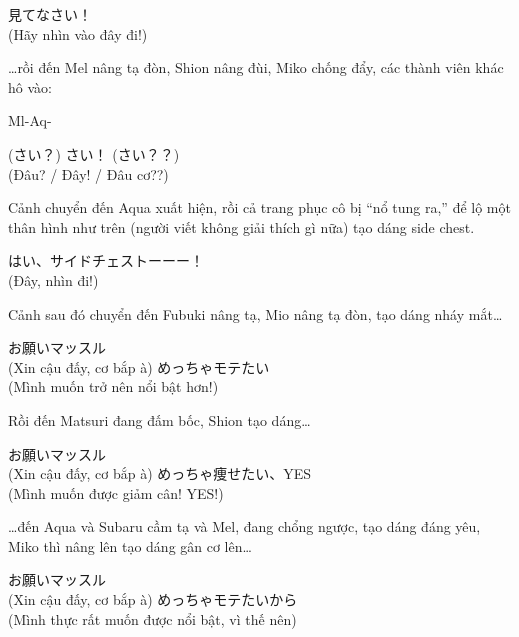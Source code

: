 \documentclass[../main.tex]{subfiles}
\begin{document}
\begin{dialogue}
   見てなさい！\\(Hãy nhìn vào đây đi!)
\end{dialogue}

\dots rồi đến Mel nâng tạ đòn, Shion nâng đùi, Miko chống đẩy, các thành viên khác hô vào:

Ml-Aq- \xdo

\begin{dialogue}
   (さい？) さい！ (さい？？)\\(Đâu? / Đây! / Đâu cơ??)
\end{dialogue}

Cảnh chuyển đến Aqua xuất hiện, rồi cả trang phục cô bị ``nổ tung ra,'' để lộ một thân hình như trên (người viết không giải thích gì nữa) tạo dáng side chest.

\begin{dialogue}
   はい、サイドチェストーーー！\\(Đây, nhìn đi!)
\end{dialogue}

Cảnh sau đó chuyển đến Fubuki nâng tạ, Mio nâng tạ đòn, tạo dáng nháy mắt\dots

\begin{dialogue}
   お願いマッスル\\(Xin cậu đấy, cơ bắp à)
   めっちゃモテたい\\(Mình muốn trở nên nổi bật hơn!)
\end{dialogue}

Rồi đến Matsuri đang đấm bốc, Shion tạo dáng\dots

\begin{dialogue}
   お願いマッスル\\(Xin cậu đấy, cơ bắp à)
   めっちゃ痩せたい、YES\\(Mình muốn được giảm cân! YES!)
\end{dialogue}

\dots đến Aqua và Subaru cầm tạ và Mel, đang chổng ngược, tạo dáng đáng yêu, Miko thì nâng lên tạo dáng gân cơ lên\dots

\begin{dialogue}
   お願いマッスル\\(Xin cậu đấy, cơ bắp à)
   めっちゃモテたいから\\(Mình thực rất muốn được nổi bật, vì thế nên)
\end{dialogue}
\end{document}
